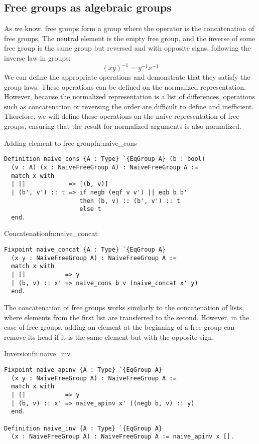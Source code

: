 \subsection{Free groups as algebraic groups}
As we know, free groups form a group where the operator is the concatenation of free groups. The neutral element is the empty free group, and the inverse of some free group is the same group but reversed and with opposite signs, following the inverse law in groups:
$$
(xy)^{-1} = y^{-1}x^{-1}
$$
We can define the appropriate operations and demonstrate that they satisfy the group laws. These operations can be defined on the normalized representation. However, because the normalized representation is a list of differences, operations such as concatenation or reversing the order are difficult to define and inefficient. Therefore, we will define these operations on the naive representation of free groups, ensuring that the result for normalized arguments is also normalized.
\begin{func}{Adding element to free group}{fn:naive_cons}
\begin{verbatim}
Definition naive_cons {A : Type} `{EqGroup A} (b : bool) 
  (v : A) (x : NaiveFreeGroup A) : NaiveFreeGroup A :=
  match x with
  | []            => [(b, v)]
  | (b', v') :: t => if negb (eqf v v') || eqb b b'
                     then (b, v) :: (b', v') :: t
                     else t
  end.
\end{verbatim}
\end{func}
\begin{func}{Concatenation}{fn:naive_concat}
\begin{verbatim}
Fixpoint naive_concat {A : Type} `{EqGroup A} 
  (x y : NaiveFreeGroup A) : NaiveFreeGroup A :=
  match x with
  | []           => y
  | (b, v) :: x' => naive_cons b v (naive_concat x' y)
  end.
\end{verbatim}
\end{func}
The concatenation of free groups  works similarly to the concatenation of lists, where elements from the first list are transferred to the second. However, in the case of free groups, adding an element at the beginning of a free group can remove its head if it is the same element but with the opposite sign.
\begin{func}{Inversion}{fn:naive_inv}
\begin{verbatim}
Fixpoint naive_apinv {A : Type} `{EqGroup A} 
  (x y : NaiveFreeGroup A) : NaiveFreeGroup A :=
  match x with
  | []           => y
  | (b, v) :: x' => naive_apinv x' ((negb b, v) :: y)
  end.

Definition naive_inv {A : Type} `{EqGroup A} 
  (x : NaiveFreeGroup A) : NaiveFreeGroup A := naive_apinv x [].
\end{verbatim}
\end{func}
